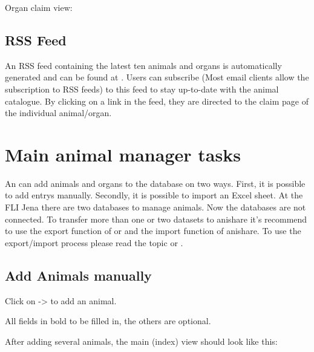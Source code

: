 \documentclass[letterpaper,10pt,openany,oneside,english]{sphinxmanual}
\begin{document}
Organ claim view:

\noindent{}


\subsection{RSS Feed}
\label{\detokenize{index:rss-feed}}
An RSS feed containing the latest ten animals and organs is automatically generated and can be found at
. Users can subscribe (Most email clients allow the subscription
to RSS feeds) to this feed to stay up-to-date with the animal catalogue. By clicking on a link in
the feed, they are directed to the claim page of the individual animal/organ.

\noindent{}


\section{Main animal manager tasks}
\label{\detokenize{index:main-animal-manager-tasks}}
An  can add animals and organs to the database on two ways. First, it is possible to
add entrys manually. Secondly, it is possible to import an Excel sheet. At the FLI Jena there are two
databases to manage animals. Now the databases are not connected. To transfer more than one or two datasets
to anishare it’s recommend to use the export function of  or  and the import function of anishare.
To use the export/import process please read the topic  or .

\noindent{}


\subsection{Add Animals manually}
\label{\detokenize{index:add-animals-manually}}
Click on  -\textgreater{}  to add an animal.

\noindent{}

All fields in bold  to be filled in, the others are optional.

After adding several animals, the main (index) view should look like this:
\end{document}
